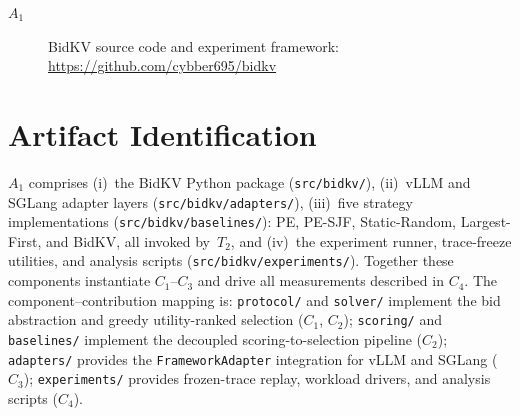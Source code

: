 \documentclass[conference]{IEEEtran}
\begin{document}
\begin{description}
\item[$A_1$] BidKV source code and experiment framework:\\
  \url{https://github.com/cybber695/bidkv}
\end{description}

\begin{center}
\end{center}


\section{Artifact Identification}

\newartifact

\artrel

$A_1$ comprises (i)~the BidKV Python package
(\texttt{src/bidkv/}), (ii)~vLLM and SGLang adapter layers
(\texttt{src/bidkv/adapters/}), (iii)~five strategy
implementations (\texttt{src/bidkv/baselines/}): PE, PE-SJF,
Static-Random, Largest-First, and BidKV, all invoked by~$T_2$,
and (iv)~the experiment runner, trace-freeze utilities, and analysis
scripts (\texttt{src/bidkv/experiments/}).
Together these components instantiate $C_1$--$C_3$ and drive all
measurements described in $C_4$.
The component--contribution mapping is:
\texttt{protocol/} and \texttt{solver/} implement the bid abstraction
and greedy utility-ranked selection ($C_1$, $C_2$);
\texttt{scoring/} and \texttt{baselines/} implement the decoupled
scoring-to-selection pipeline ($C_2$);
\texttt{adapters/} provides the \texttt{FrameworkAdapter} integration
for vLLM and SGLang ($C_3$);
\texttt{experiments/} provides frozen-trace replay, workload drivers,
and analysis scripts ($C_4$).
\end{document}
